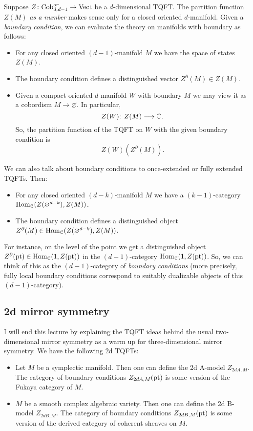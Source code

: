 Suppose $Z\colon \mathrm{Cob}^{or}_{d, d-1}\rightarrow \mathrm{Vect}$ be a $d$-dimensional TQFT. The partition function $Z(M)$ \emph{as a number} makes sense only for a closed oriented $d$-manifold. Given a \emph{boundary condition}, we can evaluate the theory on manifolds with boundary as follows:
\begin{itemize}
	\item For any closed oriented $(d-1)$-manifold $M$ we have the space of states $Z(M)$.
	\item The boundary condition defines a distinguished vector $Z^\partial(M)\in Z(M)$.
	\item Given a compact oriented $d$-manifold $W$ with boundary $M$ we may view it as a cobordism $M\rightarrow \varnothing$. In particular,
	\[Z(W)\colon Z(M)\longrightarrow \mathbb{C}.\]
	So, the partition function of the TQFT on $W$ with the given boundary condition is
	\[Z(W)(Z^\partial(M)).\]
\end{itemize}

We can also talk about boundary conditions to once-extended or fully extended TQFTs. Then:
\begin{itemize}
	\item For any closed oriented $(d-k)$-manifold $M$ we have a $(k-1)$-category $\mathrm{Hom}_{\mathcal{C}}(Z(\varnothing^{d-k}), Z(M))$.
	\item The boundary condition defines a distinguished object $Z^\partial(M)\in \mathrm{Hom}_{\mathcal{C}}(Z(\varnothing^{d-k}), Z(M))$.
\end{itemize}

For instance, on the level of the point we get a distinguished object $Z^\partial(\mathrm{pt})\in\mathrm{Hom}_{\mathcal{C}}(1, Z(\mathrm{pt}))$ in the $(d-1)$-category $\mathrm{Hom}_{\mathcal{C}}(1, Z(\mathrm{pt}))$. So, we can think of this as the $(d-1)$-category of \emph{boundary conditions} (more precisely, fully local boundary conditions correspond to suitably dualizable objects of this $(d-1)$-category).

\subsection{2d mirror symmetry}

I will end this lecture by explaining the TQFT ideas behind the usual two-dimensional mirror symmetry as a warm up for three-dimensional mirror symmetry. We have the following 2d TQFTs:
\begin{itemize}
	\item Let $M$ be a symplectic manifold. Then one can define the 2d A-model $Z_{2dA, M}$. The category of boundary conditions $Z_{2dA, M}(\mathrm{pt})$ is some version of the Fukaya category of $M$.
	
	\item $M$ be a smooth complex algebraic variety. Then one can define the 2d B-model $Z_{2dB, M}$. The category of boundary conditions $Z_{2dB, M}(\mathrm{pt})$ is some version of the derived category of coherent sheaves on $M$.
\end{itemize}

